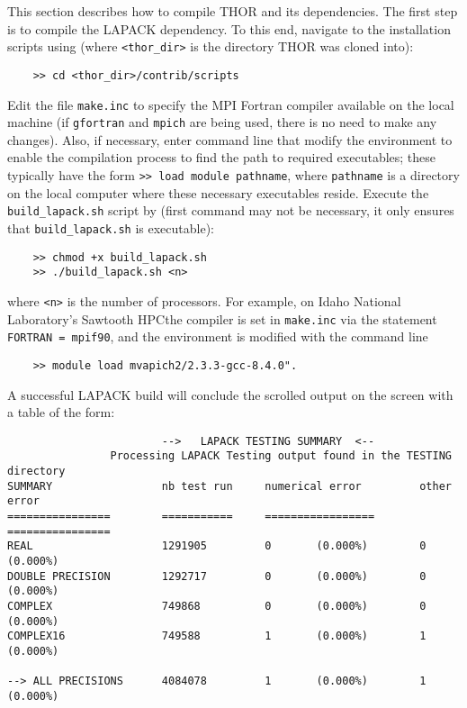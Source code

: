 This section describes how to compile \ac{THOR} and its dependencies.
The first step is to compile the \ac{LAPACK} dependency.
To this end, navigate to the installation scripts using (where \verb"<thor_dir>" is the directory \ac{THOR} was cloned into):
\begin{verbatim}
    >> cd <thor_dir>/contrib/scripts
\end{verbatim}
Edit the file \verb"make.inc" to specify the MPI Fortran compiler available on the local machine (if {\tt gfortran} and {\tt mpich} are being used, there is no need to make any changes).
Also, if necessary, enter command line that modify the environment to enable the compilation process to find the path to required executables; these typically have the form \verb">> load module pathname", where \verb"pathname" is a directory on the local computer where these necessary executables reside.
Execute the \verb"build_lapack.sh" script by (first command may not be necessary, it only ensures that \verb"build_lapack.sh" is executable):
\begin{verbatim}
    >> chmod +x build_lapack.sh
    >> ./build_lapack.sh <n>
\end{verbatim}
where \verb"<n>" is the number of processors.
For example, on Idaho National Laboratory's Sawtooth HPCthe compiler is set in \verb"make.inc" via the statement \verb"FORTRAN = mpif90", and the environment is  modified with the command line
\begin{verbatim}
    >> module load mvapich2/2.3.3-gcc-8.4.0".
\end{verbatim}
A successful \ac{LAPACK} build will conclude the scrolled output on the screen with a table of the form:
\begin{verbatim}
                        -->   LAPACK TESTING SUMMARY  <--
                Processing LAPACK Testing output found in the TESTING directory
SUMMARY                 nb test run     numerical error         other error
================        ===========     =================       ================
REAL                    1291905         0       (0.000%)        0       (0.000%)
DOUBLE PRECISION        1292717         0       (0.000%)        0       (0.000%)
COMPLEX                 749868          0       (0.000%)        0       (0.000%)
COMPLEX16               749588          1       (0.000%)        1       (0.000%)

--> ALL PRECISIONS      4084078         1       (0.000%)        1       (0.000%)
\end{verbatim}
